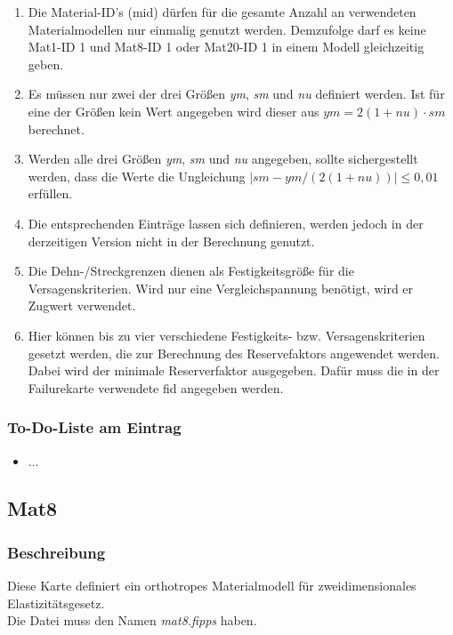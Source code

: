 \documentclass[11pt,titlepage,listof=totoc,bibliography=totoc,twoside]{scrreprt}
\begin{document}
{{\begin{enumerate}
\item Die Material-ID's (mid) dürfen für die gesamte Anzahl an verwendeten Materialmodellen nur einmalig genutzt werden. Demzufolge darf es keine Mat1-ID 1 und Mat8-ID 1 oder Mat20-ID 1 in einem Modell gleichzeitig geben.
\item Es müssen nur zwei der drei Größen \emph{ym}, \emph{sm} und \emph{nu} definiert werden. Ist für eine der Größen kein Wert angegeben wird dieser aus $ym=2\left(1+nu\right)\cdot sm$ berechnet.
\item Werden alle drei Größen \emph{ym}, \emph{sm} und \emph{nu} angegeben, sollte sichergestellt werden, dass die Werte die Ungleichung $\left|sm-ym/\left(2\left(1+nu\right)\right)\right|\le0{,}01$ erfüllen.
\item Die entsprechenden Einträge lassen sich definieren, werden jedoch in der derzeitigen Version nicht in der Berechnung genutzt.
\item Die Dehn-/Streckgrenzen dienen als Festigkeitsgröße für die Versagenskriterien. Wird nur eine Vergleichspannung benötigt, wird er Zugwert verwendet.
\item Hier können bis zu vier verschiedene Festigkeits- bzw. Versagenskriterien gesetzt werden, die zur Berechnung des Reservefaktors angewendet werden. Dabei wird der minimale Reserverfaktor ausgegeben. Dafür muss die in der Failurekarte verwendete fid angegeben werden.
\end{enumerate}

\subsubsection{To-Do-Liste am Eintrag}

\begin{itemize}
\item ...
\end{itemize}

\newpage

\subsection{Mat8}

\subsubsection{Beschreibung}

Diese Karte definiert ein orthotropes Materialmodell für zweidimensionales Elastizitätsgesetz.\\
Die Datei muss den Namen \emph{mat8.fipps} haben.

}}
\end{document}
